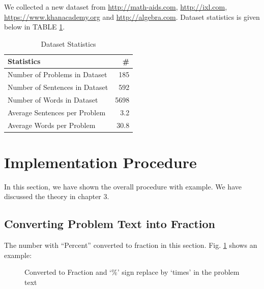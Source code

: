 \documentclass[document.tex]{subfiles}
\begin{document}
We collected a new dataset from \url{http://math-aids.com}, \url{http://ixl.com}, \url{https://www.khanacademy.org} and \url{http://algebra.com}. Dataset statistics is given below in TABLE \ref{tab:datasetstat}.

\begin{table}[H]
	\caption{Dataset Statistics}
	\begin{center}
		\begin{tabular}{|l | r|}
			\hline
			\textbf{Statistics}& \# \\ \hline
			Number of Problems in Dataset& 185 \\
			Number of Sentences in Dataset& 592\\
			Number of Words in Dataset& 5698\\
			Average Sentences per Problem& 3.2\\
			Average Words per Problem& 30.8\\
			\hline
		\end{tabular}
	\end{center}
	\label{tab:datasetstat}
\end{table}

\section{Implementation Procedure} In this section, we have shown the overall procedure with example. We have discussed the theory in chapter 3.

\subsection{Converting Problem Text into Fraction}
The number with ``Percent'' converted to fraction in this section. Fig. \ref{fig:i_conv} shows an example:
\begin{figure}[H]
	
	\caption{Converted to Fraction and ‘\%’ sign replace by ‘times’ in the problem text}
	\label{fig:i_conv}
\end{figure}
\end{document}
